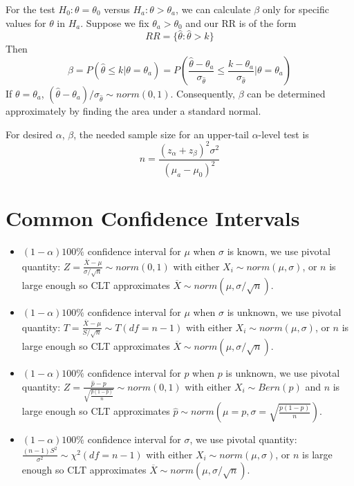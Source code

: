 \documentclass[12pt, a4paper, twoside, openright, titlepage]{book}
\begin{document}
For the test $H_0:\theta = \theta_0$ versus $H_a: \theta > \theta_a$, we can calculate $\beta$ only for specific values for $\theta$ in $H_a$. Suppose we fix $\theta_a > \theta_0$ and our RR is of the form \begin{equation*}
    RR = \{\hat{\theta}:\hat{\theta} > k\}
\end{equation*}
Then \begin{equation*}
    \beta = P(\hat{\theta} \leq k\vert \theta = \theta_a) = P\left( \frac{\hat{\theta} - \theta_a}{\sigma_{\hat{\theta}}}\leq \frac{k-\theta_a}{\sigma_{\hat{\theta}}}\Bigg\rvert \theta = \theta_a\right)
\end{equation*}
If $\theta = \theta_a$, $(\hat{\theta}-\theta_a)/\sigma_{\hat{\theta}}\sim norm(0,1)$. Consequently, $\beta$ can be determined approximately by finding the area under a standard normal.



\begin{claim}{}{}
    For desired $\alpha$, $\beta$, the needed sample size for an upper-tail $\alpha$-level test is \begin{equation*}
        n = \frac{(z_{\alpha}+z_{\beta})^2\sigma^2}{(\mu_a - \mu_0)^2}
    \end{equation*}
\end{claim}


\section{\textsection Common Confidence Intervals}

\begin{rmk}{}{}
    \leavevmode
    \begin{itemize}
        \item $(1-\alpha)100\%$ confidence interval for $\mu$ when $\sigma$ is known, we use pivotal quantity: $Z = \frac{\overline{X} - \mu}{\sigma/\sqrt{n}}\sim norm(0,1)$ with either $X_i \sim norm(\mu,\sigma)$, or $n$ is large enough so CLT approximates $\overline{X} \sim norm(\mu, \sigma/\sqrt{n})$.
        \item $(1-\alpha)100\%$ confidence interval for $\mu$ when $\sigma$ is unknown, we use pivotal quantity: $T = \frac{\overline{X} - \mu}{S/\sqrt{n}}\sim T(df = n-1)$ with either $X_i \sim norm(\mu,\sigma)$, or $n$ is large enough so CLT approximates $\overline{X} \sim norm(\mu, \sigma/\sqrt{n})$.
        \item $(1-\alpha)100\%$ confidence interval for $p$ when $p$ is unknown, we use pivotal quantity: $Z = \frac{\hat{p} - p}{\sqrt{\frac{\hat{p}(1-\hat{p})}{n}}}\sim norm(0,1)$ with either $X_i \sim Bern(p)$ and $n$ is large enough so CLT approximates $\hat{p} \sim norm(\mu = p, \sigma = \sqrt{\frac{p(1-p)}{n}})$.
        \item $(1-\alpha)100\%$ confidence interval for $\sigma$, we use pivotal quantity: $\frac{(n-1)S^2}{\sigma^2}\sim \chi^2(df = n-1)$ with either $X_i \sim norm(\mu,\sigma)$, or $n$ is large enough so CLT approximates $\overline{X} \sim norm(\mu, \sigma/\sqrt{n})$.
    \end{itemize}
\end{rmk}
\end{document}
